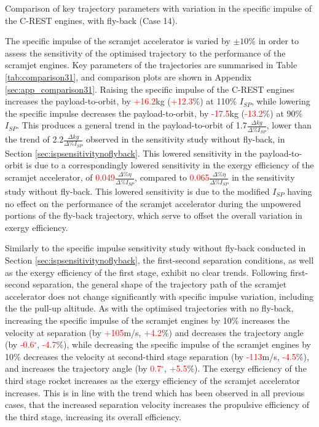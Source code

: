 \begin{table}[ht]
	\caption{Comparison of key trajectory parameters with variation in the specific impulse of the C-REST engines, with fly-back (Case 14).}
	\label{tab:comparison31}
\end{table}

The specific impulse of the scramjet accelerator is varied by $\pm10\%$ in order to assess the sensitivity of the optimised trajectory to the performance of the scramjet engines. 
Key parameters of the trajectories are summarised in Table \ref{tab:comparison31}, and comparison plots are shown in Appendix \ref{sec:app_comparison31}.
Raising the specific impulse of the C-REST engines increases the payload-to-orbit, by \textcolor{red}{+16.2}kg (\textcolor{red}{+12.3}\%) at 110\% $I_{SP}$, while lowering the specific impulse decreases the payload-to-orbit, by \textcolor{red}{-17.5}kg (\textcolor{red}{-13.2}\%) at 90\% $I_{SP}$. 
This produces a general trend in the payload-to-orbit of 1.7$\frac{\Delta kg}{\Delta \%I_{SP} }$, lower than the trend of 2.2$\frac{\Delta kg}{\Delta \%I_{SP} }$ observed in the sensitivity study without fly-back, in Section \ref{sec:ispsensitivitynoflyback}. 
This lowered sensitivity in the payload-to-orbit is due to a correspondingly lowered sensitivity in the exergy efficiency of the scramjet accelerator, of \textcolor{red}{0.049}$\frac{\Delta \% \eta}{\Delta \%I_{SP} }$, compared to \textcolor{red}{0.065}$\frac{\Delta \% \eta}{\Delta \%I_{SP} }$ in the sensitivity study without fly-back. This lowered sensitivity is due to the modified $I_{SP}$ having no effect on the performance of the scramjet accelerator during the unpowered portions of the fly-back trajectory, which serve to offset the overall variation in exergy efficiency. 


Similarly to the specific impulse sensitivity study without fly-back conducted in Section \ref{sec:ispsensitivitynoflyback}, the first-second separation conditions, as well as the exergy efficiency of the first stage, exhibit no clear trends. Following first-second separation, the general shape of the trajectory path of the scramjet accelerator does not change significantly with specific impulse variation, including the the pull-up altitude. As with the optimised trajectories with no fly-back, increasing the specific impulse of the scramjet engines by 10\% increases the velocity at separation (by \textcolor{red}{+105}m/s, \textcolor{red}{+4.2}\%) and decreases the trajectory angle (by \textcolor{red}{-0.6}$^\circ$, \textcolor{red}{-4.7}\%), while decreasing the specific impulse of the scramjet engines by 10\% decreases the velocity at second-third stage separation (by \textcolor{red}{-113}m/s, \textcolor{red}{-4.5}\%), and increases the trajectory angle (by \textcolor{red}{0.7}$^\circ$, \textcolor{red}{+5.5}\%).
The exergy efficiency of the third stage rocket increases as the exergy efficiency of the scramjet accelerator increases. This is in line with the trend which has been observed in all previous cases, that the increased separation velocity increases the propulsive efficiency of the third stage, increasing its overall efficiency. 






